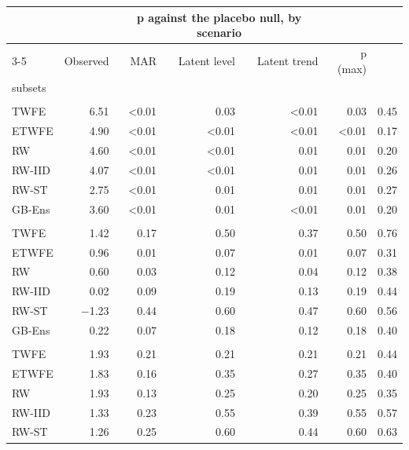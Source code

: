 \begin{table}
\fontsize{9.0pt}{11.0pt}\selectfont\setlength\tabcolsep{3.5pt}
\begin{tabular*}{1\linewidth}{@{\extracolsep{\fill}}lrrrrrr}
\toprule
 &  & \multicolumn{3}{c}{{p against the placebo null, by scenario}} &  &  \\ 
\cmidrule(lr){3-5}
 & Observed & MAR & Latent level & Latent trend & p (max) & \begin{tabular}[b]{@{}r@{}}p, 45-county\\subsets\end{tabular} \\ 
\midrule\addlinespace[2.5pt]
\multicolumn{7}{l}{T} \\[2.5pt] 
\midrule\addlinespace[2.5pt]
TWFE & 6.51 & <0.01 & 0.03 & <0.01 & 0.03 & 0.45 \\ 
ETWFE & 4.90 & <0.01 & <0.01 & <0.01 & <0.01 & 0.17 \\ 
RW & 4.60 & <0.01 & <0.01 & 0.01 & 0.01 & 0.20 \\ 
RW-IID & 4.07 & <0.01 & <0.01 & 0.01 & 0.01 & 0.26 \\ 
RW-ST & 2.75 & <0.01 & 0.01 & 0.01 & 0.01 & 0.27 \\ 
GB-Ens & 3.60 & <0.01 & 0.01 & <0.01 & 0.01 & 0.20 \\ 
\midrule\addlinespace[2.5pt]
\multicolumn{7}{l}{T(−1)} \\[2.5pt] 
\midrule\addlinespace[2.5pt]
TWFE & 1.42 & 0.17 & 0.50 & 0.37 & 0.50 & 0.76 \\ 
ETWFE & 0.96 & 0.01 & 0.07 & 0.01 & 0.07 & 0.31 \\ 
RW & 0.60 & 0.03 & 0.12 & 0.04 & 0.12 & 0.38 \\ 
RW-IID & 0.02 & 0.09 & 0.19 & 0.13 & 0.19 & 0.44 \\ 
RW-ST & −1.23 & 0.44 & 0.60 & 0.47 & 0.60 & 0.56 \\ 
GB-Ens & 0.22 & 0.07 & 0.18 & 0.12 & 0.18 & 0.40 \\ 
\midrule\addlinespace[2.5pt]
\multicolumn{7}{l}{Q* (secondary)} \\[2.5pt] 
\midrule\addlinespace[2.5pt]
TWFE & 1.93 & 0.21 & 0.21 & 0.21 & 0.21 & 0.44 \\ 
ETWFE & 1.83 & 0.16 & 0.35 & 0.27 & 0.35 & 0.40 \\ 
RW & 1.93 & 0.13 & 0.25 & 0.20 & 0.25 & 0.35 \\ 
RW-IID & 1.33 & 0.23 & 0.55 & 0.39 & 0.55 & 0.57 \\ 
RW-ST & 1.26 & 0.25 & 0.60 & 0.44 & 0.60 & 0.63 \\ 

\end{tabular*}
\end{table}
